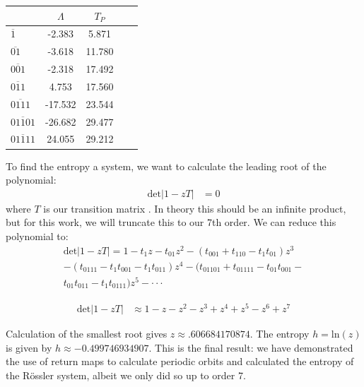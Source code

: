 \documentclass[12 pt]{article}
\begin{document}
\begin{center}
  \begin{tabular}{| l | c | c | c  | r| }
    \hline
     & $\Lambda$ & $T_P$ \\ \hline
    $\overline{1}$  & -2.383 & 5.871\\ \hline
    $\overline{01}$ &  -3.618 & 11.780 \\ \hline
    $\overline{001}$ &  -2.318 & 17.492 \\ \hline
    $\overline{011}$ & 4.753 & 17.560  \\ \hline
    $\overline{0111}$ &  -17.532 & 23.544 \\ \hline
    $\overline{01101}$ &  -26.682 & 29.477 \\ \hline
    $\overline{01111}$ & 24.055 & 29.212 \\ \hline
  \end{tabular}
  \label{Tab:Eigenvales}
\end{center}

To find the entropy a system, we want to calculate the leading root of the polynomial:
\begin{equation}
\begin{split}
\text{det}|1-zT| &=0
\end{split}
\end{equation}
where $T$ is our transition matrix \cite{CB}. In theory this should be an infinite product, but for this work, we will truncate this to our 7th order.  We can reduce this polynomial to:
\begin{equation}
\begin{split}
\text{det}|1-zT| = 1 - t_{1}z - t_{01}z^2 - (t_{001} + t_{110} - t_{1}t_{01})z^3 \\ -(t_{0111} -t_{1}t_{001}-t_{1}t_{011})z^4  -(t_{01101}+t_{01111}-t_{01}t_{001}- \\ t_{01}t_{011}-t_{1}t_{0111})z^5 - \cdot \cdot \cdot
\end{split}
\end{equation}

\begin{equation}
\begin{split}
\text{det}|1-zT| &\approx 1 - z -z^2 - z^3 +z^4+z^5-z^6+z^7
\end{split}
\end{equation}

Calculation of the smallest root gives $z \approx .606684170874$.  The entropy $h = \text{ln}(z)$ is given by $h \approx -0.499746934907$.   This is the final result: we have demonstrated the use of return maps to calculate periodic orbits and calculated the entropy of the R\"ossler system, albeit we only did so up to order 7.
\end{document}
